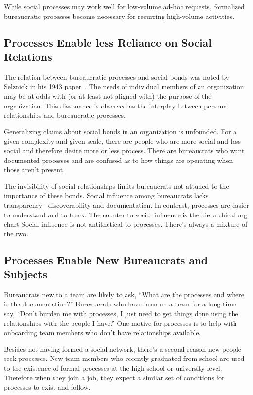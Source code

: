 While social processes may work well for low-volume ad-hoc requests, formalized bureaucratic processes become necessary for recurring high-volume activities.

\subsection*{Processes Enable less Reliance on Social Relations}

The relation between bureaucratic processes and social bonds was noted by Selznick in his 1943 paper~\cite{1943_Selznick}. The needs of individual members of an organization may be at odds with (or at least not aligned with) the purpose of the organization. This dissonance is observed as the interplay between personal relationships and bureaucratic processes.

Generalizing claims about social bonds in an organization is unfounded. 
For a given complexity and given scale, there are people who are more social and less social and therefore desire more or less process.
There are bureaucrats who want documented processes and are confused as to how things are operating when those aren't present. 

The invisibility of social relationships limits bureaucrats not attuned to the importance of these bonds. 
Social influence among bureaucrats lacks transparency-- discoverability and documentation. 
In contrast, processes are easier to understand and to track. The counter to social influence is the hierarchical 
\gls{org chart}\iftoggle{haspagenumbers}{ described on 
page~\pageref{sec:org-chart-as-guide-and-lie}.}{.}
Social influence is not antithetical to processes. There's always a mixture of the two.


\subsection*{Processes Enable New Bureaucrats and Subjects}

Bureaucrats new to a team are likely to ask, ``What are the processes and where is the documentation?'' Bureaucrats who have been on a team for a long time say, ``Don't burden me with processes, I just need to get things done using the relationships with the people I have.'' One motive for processes is to help with onboarding team members who don't have relationships available.

Besides not having formed a social network, there's a second reason new people seek processes. New team members who recently graduated from school are used to the existence of formal processes at the high school or university level. Therefore when they join a job, they expect a similar set of conditions for processes to exist and follow.

